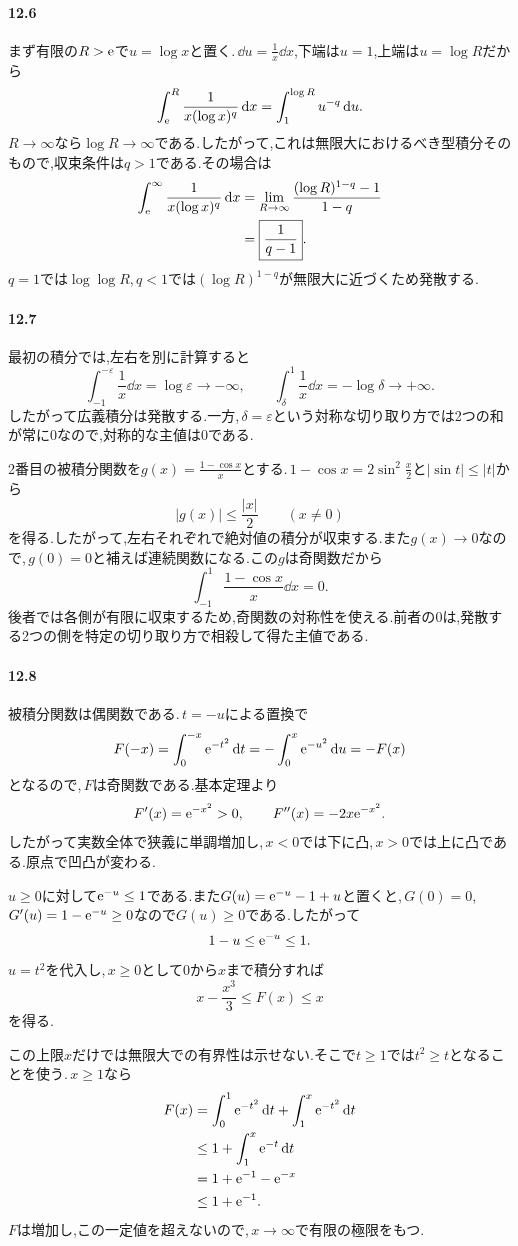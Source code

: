 \paragraph{12.6}
まず有限の$R>\mathrm{e}$で$u=\log x$と置く.\,$\dd u=\frac1x\dd x$,下端は$u=1$,上端は$u=\log R$だから
\[
 \int_{\mathrm{e}}^R\frac1{x(\log x)^q}\,\mathrm{d} x
 =\int_1^{\log R}u^{-q}\,\mathrm{d} u.
\]
$R\to\infty$なら$\log R\to\infty$である.したがって,これは無限大におけるべき型積分そのもので,収束条件は$q>1$である.その場合は
\begin{align*}
 \int_{\mathrm{e}}^{\infty}\frac1{x(\log x)^q}\,\mathrm{d} x
 &=\lim_{R\to\infty}\frac{(\log R)^{1-q}-1}{1-q}\\
 &=\boxed{\frac1{q-1}}.
\end{align*}
$q=1$では$\log\log R$,\,$q<1$では$(\log R)^{1-q}$が無限大に近づくため発散する.

\paragraph{12.7}
最初の積分では,左右を別に計算すると
\[
 \int_{-1}^{-\varepsilon}\frac1x\dd x=\log\varepsilon\to-\infty,
 \qquad
 \int_{\delta}^{1}\frac1x\dd x=-\log\delta\to+\infty.
\]
したがって広義積分は発散する.一方,\,$\delta=\varepsilon$という対称な切り取り方では2つの和が常に$0$なので,対称的な主値は$0$である.

2番目の被積分関数を$g(x)=\frac{1-\cos x}{x}$とする.\,$1-\cos x=2\sin^2\frac x2$と$|\sin t|\le|t|$から
\[
 |g(x)|\le\frac{|x|}{2}\qquad(x\ne0)
\]
を得る.したがって,左右それぞれで絶対値の積分が収束する.また$g(x)\to0$なので,\,$g(0)=0$と補えば連続関数になる.この$g$は奇関数だから
\[
 \int_{-1}^1\frac{1-\cos x}{x}\dd x=0.
\]
後者では各側が有限に収束するため,奇関数の対称性を使える.前者の$0$は,発散する2つの側を特定の切り取り方で相殺して得た主値である.

\paragraph{12.8}
被積分関数は偶関数である.\,$t=-u$による置換で
\[
 F(-x)=\int_0^{-x}\mathrm{e}^{-t^2}\,\mathrm{d} t
 =-\int_0^x\mathrm{e}^{-u^2}\,\mathrm{d} u=-F(x)
\]
となるので,\,$F$は奇関数である.基本定理より
\[
 F'(x)=\mathrm{e}^{-x^2}>0,\qquad F''(x)=-2x\mathrm{e}^{-x^2}.
\]
したがって実数全体で狭義に単調増加し,\,$x<0$では下に凸,\,$x>0$では上に凸である.原点で凹凸が変わる.

$u\ge0$に対して$\mathrm{e}^{-u}\le1$である.また$G(u)=\mathrm{e}^{-u}-1+u$と置くと,\,$G(0)=0$,\,$G'(u)=1-\mathrm{e}^{-u}\ge0$なので$G(u)\ge0$である.したがって
\[
 1-u\le\mathrm{e}^{-u}\le1.
\]
$u=t^2$を代入し,\,$x\ge0$として$0$から$x$まで積分すれば
\[
 \boxed{x-\frac{x^3}{3}\le F(x)\le x}
\]
を得る.

この上限$x$だけでは無限大での有界性は示せない.そこで$t\ge1$では$t^2\ge t$となることを使う.\,$x\ge1$なら
\begin{align*}
 F(x)&=\int_0^1\mathrm{e}^{-t^2}\,\mathrm{d} t+\int_1^x\mathrm{e}^{-t^2}\,\mathrm{d} t\\
 &\le1+\int_1^x\mathrm{e}^{-t}\,\mathrm{d} t\\
 &=1+\mathrm{e}^{-1}-\mathrm{e}^{-x}\\
 &\le1+\mathrm{e}^{-1}.
\end{align*}
$F$は増加し,この一定値を超えないので,\,$x\to\infty$で有限の極限をもつ.
